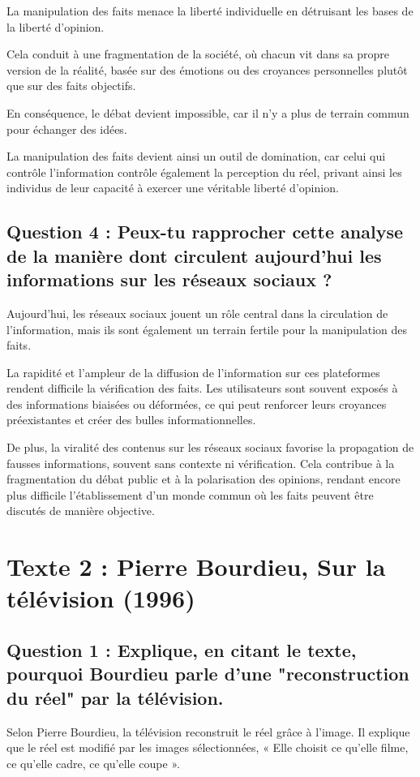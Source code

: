 \documentclass[a4paper,12pt]{article}
\begin{document}
La manipulation des faits menace la liberté individuelle en détruisant les bases de la liberté d’opinion. 

Cela conduit à une fragmentation de la société, où chacun vit dans sa propre version de la réalité, basée sur des émotions ou des croyances personnelles plutôt que sur des faits objectifs. 

En conséquence, le débat devient impossible, car il n’y a plus de terrain commun pour échanger des idées. 

La manipulation des faits devient ainsi un outil de domination, car celui qui contrôle l’information contrôle également la perception du réel, privant ainsi les individus de leur capacité à exercer une véritable liberté d’opinion.

\subsection*{Question 4 : Peux-tu rapprocher cette analyse de la manière dont circulent aujourd’hui les
informations sur les réseaux sociaux ?}
Aujourd’hui, les réseaux sociaux jouent un rôle central dans la circulation de l’information, mais ils sont également un terrain fertile pour la manipulation des faits.

La rapidité et l'ampleur de la diffusion de l'information sur ces plateformes rendent difficile la vérification des faits. Les utilisateurs sont souvent exposés à des informations biaisées ou déformées, ce qui peut renforcer leurs croyances préexistantes et créer des bulles informationnelles. 

De plus, la viralité des contenus sur les réseaux sociaux favorise la propagation de fausses informations, souvent sans contexte ni vérification. Cela contribue à la fragmentation du débat public et à la polarisation des opinions, rendant encore plus difficile l'établissement d'un monde commun où les faits peuvent être discutés de manière objective.

\section*{Texte 2 : Pierre Bourdieu, Sur la télévision (1996)}
\vspace{1cm}

\subsection*{Question 1 : Explique, en citant le texte, pourquoi Bourdieu parle d'une "reconstruction du réel" par la télévision.}
Selon Pierre Bourdieu, la télévision reconstruit le réel grâce à l'image. Il explique que le réel est modifié par les images sélectionnées, 
« Elle choisit ce qu'elle filme, ce qu'elle cadre, ce qu'elle coupe ». 
\end{document}
